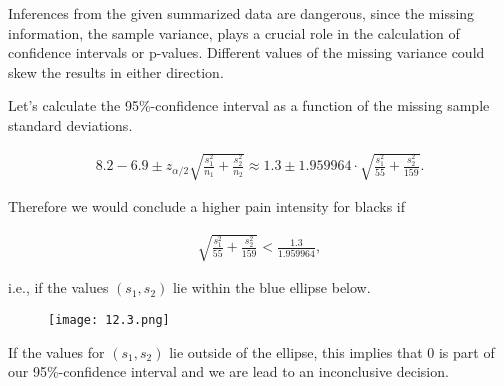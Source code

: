 \begin{solution}

Inferences from the given summarized data are dangerous, since the missing
information, the sample variance, plays a crucial role in the calculation
of confidence intervals or p-values. Different values of the missing variance
could skew the results in either direction.

Let's calculate the 95\%-confidence interval 
as a function of the missing sample standard deviations.

\begin{align*}
    8.2 - 6.9 \pm z_{\alpha/2}\sqrt{\frac{s_1^2}{n_1} + \frac{s_2^2}{n_2}}
    \approx  1.3 \pm 1.959964 \cdot \sqrt{\frac{s_1^2}{55} + \frac{s_2^2}{159}}.
\end{align*}

Therefore we would conclude a higher pain intensity for blacks if

\begin{align*}
    \sqrt{\frac{s_1^2}{55} + \frac{s_2^2}{159}} < \frac{1.3}{1.959964},
\end{align*}

i.e., if the values $(s_1,s_2)$ lie within the blue ellipse below.

\begin{figure}[H]
    \centering
    \texttt{[image: 12.3.png]}
\end{figure}

If the values for $(s_1,s_2)$ lie outside of the ellipse, this implies
that $0$ is part of our 95\%-confidence interval and we are lead to
an inconclusive decision.

\end{solution}

